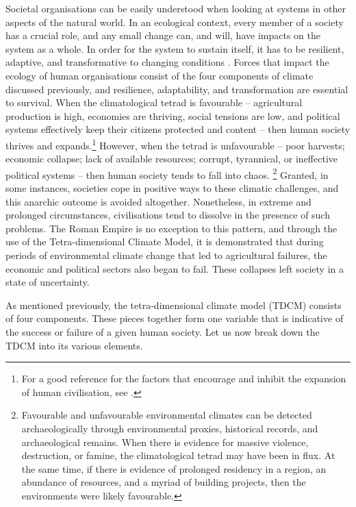 	Societal organisations can be easily understood when looking at systems in other aspects of the natural world. In an ecological context, every member of a society has a crucial role, and any small change can, and will, have impacts on the system as a whole. In order for the system to sustain itself, it has to be resilient, adaptive, and transformative to changing conditions \parencite{Walker_2004}. Forces that impact the ecology of human organisations consist of the four components of climate discussed previously, and resilience, adaptability, and transformation are essential to survival. When the climatological tetrad is favourable – agricultural production is high, economies are thriving, social tensions are low, and political systems effectively keep their citizens protected and content – then human society thrives and expands.\footnote{For a good reference for the factors that encourage and inhibit the expansion of human civilisation, see \textcite{Diamond_1997}.} However, when the tetrad is unfavourable – poor harvests; economic collapse; lack of available resources; corrupt, tyrannical, or ineffective political systems – then human society tends to fall into chaos. \footnote{Favourable and unfavourable environmental climates can be detected archaeologically through environmental proxies, historical records, and archaeological remains. When there is evidence for massive violence, destruction, or famine, the climatological tetrad may have been in flux. At the same time, if there is evidence of prolonged residency in a region, an abundance of resources, and a myriad of building projects, then the environments were likely favourable.} Granted, in some instances, societies cope in positive ways to these climatic challenges, and this anarchic outcome is avoided altogether. Nonetheless, in extreme and prolonged circumstances, civilisations tend to dissolve in the presence of such problems. The Roman Empire is no exception to this pattern, and through the use of the Tetra-dimensional Climate Model, it is demonstrated that during periods of environmental climate change that led to agricultural failures, the economic and political sectors also began to fail. These collapses left society in a state of uncertainty. 

As mentioned previously, the tetra-dimensional climate model (TDCM) consists of four components. These pieces together form one variable that is indicative of the success or failure of a given human society. Let us now break down the TDCM into its various elements.

